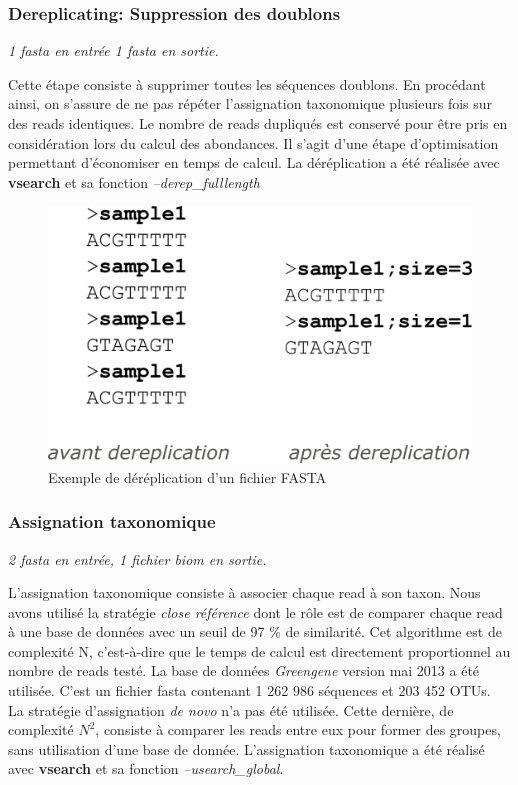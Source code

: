 \documentclass[12pt,a4paper]{article}
\begin{document}
\subsubsection{Dereplicating: Suppression des doublons}
\noindent\emph{1 fasta en entrée 1 fasta en sortie. }

Cette étape consiste à supprimer toutes les séquences doublons. En procédant ainsi, on s'assure de ne pas répéter l'assignation taxonomique plusieurs fois sur des reads identiques. Le nombre de reads dupliqués est conservé pour être pris en considération lors du calcul des abondances. Il s'agit d'une étape d'optimisation permettant d'économiser en temps de calcul. La déréplication a été réalisée avec \textbf{vsearch}\cite{TorbjornRognes2015} et sa fonction \textit{--derep\_fulllength }

\begin{figure}[ht]
\begin{center}
\includegraphics[scale=0.4]{img/dereplication.png}\hfill
\end{center}
\caption{Exemple de déréplication d'un fichier FASTA}
\label{dereplication}
\end{figure}

\subsubsection{Assignation taxonomique}
\noindent\emph{2 fasta en entrée,  1 fichier biom  en sortie. }

L’assignation taxonomique consiste à associer chaque read à son taxon. Nous avons utilisé la stratégie \textit{close référence} dont le rôle est de comparer chaque read à une base de données avec un seuil de 97 \% de similarité. Cet algorithme est de complexité N, c'est-à-dire que le temps de calcul est directement proportionnel au nombre de reads testé. La base de données \textit{Greengene}\cite{DeSantis2006} version mai 2013  a été utilisée. C'est un fichier fasta contenant 1 262 986 séquences et 203 452 OTUs. \\
La stratégie d'assignation \textit{de novo} n'a pas été utilisée. Cette dernière, de complexité $N^{2}$, consiste à comparer les reads entre eux pour former des groupes, sans utilisation d'une base de donnée.
L'assignation taxonomique a été réalisé avec \textbf{vsearch} et sa fonction \textit{--usearch\_global}.
\end{document}

